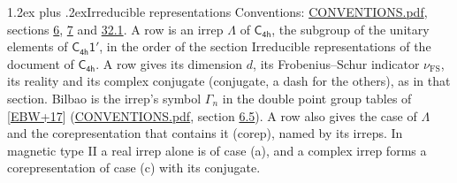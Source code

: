 \documentclass[10pt,a4paper]{article}
\makeatletter
\renewcommand\section{\@startsection{section}{1}{\z@}{-3ex plus -1ex minus -.2ex}%
  {1.2ex plus .2ex}{\normalfont\large\sffamily\bfseries\color{parttitle}}}
\numberwithin{equation}{section}
\newcommand{\grp}[1]{\mathsf{#1}}
\newcommand{\fsind}{\nu_{\mathrm{FS}}}
\makeatother
\begin{document}
\section{Irreducible representations}\label{s:irreps}
Conventions: \href{../../CONVENTIONS.pdf}{CONVENTIONS.pdf}, sections \href{../../../rotation/CONVENTIONS.pdf\#conv.6}{6}, \href{../../../rotation/CONVENTIONS.pdf\#conv.7}{7} and \href{../../CONVENTIONS.pdf\#conv.32.1}{32.1}.
\leavevmode\label{n:irrep.Delta}A row is an irrep $\Lambda$ of $\grp{C_{4h}}$, the subgroup of the unitary elements of $\grp{C_{4h}1'}$, in the order of the section Irreducible representations of the document of \href{../../../rotation/data/pdf/C4h.pdf}{$\grp{C_{4h}}$}. \label{n:index.dimension}\label{n:index.frobenius}\label{n:head.irrep}\label{n:head.reality}\label{n:head.conjugate}A row gives its dimension $d$, its Frobenius--Schur indicator $\fsind$, its reality and its complex conjugate (conjugate, a dash for the others), as in that section. \label{n:head.bilbao}\label{n:irrep.alias.gamma}Bilbao is the irrep's symbol $\Gamma_n$ in the double point group tables of [\href{../../../REFERENCES.pdf\#ref.EBW+17}{EBW+17}] (\href{../../CONVENTIONS.pdf}{CONVENTIONS.pdf}, section \href{../../../rotation/CONVENTIONS.pdf\#conv.6.5}{6.5}). \label{n:head.case.corep}\label{n:head.corep}A row also gives the case of $\Lambda$ and the corepresentation that contains it (corep), named by its irreps. In magnetic type II a real irrep alone is of case (a), and a complex irrep forms a corepresentation of case (c) with its conjugate.
\setlength{\emergencystretch}{2em}\par\setlength{\emergencystretch}{0pt}
\end{document}
